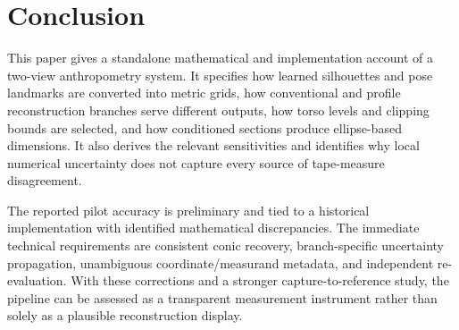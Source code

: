 \documentclass[11pt,a4paper]{article}
\numberwithin{equation}{section}
\begin{document}
\section{Conclusion}
This paper gives a standalone mathematical and implementation account of a two-view anthropometry system. It specifies how learned silhouettes and pose landmarks are converted into metric grids, how conventional and profile reconstruction branches serve different outputs, how torso levels and clipping bounds are selected, and how conditioned sections produce ellipse-based dimensions. It also derives the relevant sensitivities and identifies why local numerical uncertainty does not capture every source of tape-measure disagreement.

The reported pilot accuracy is preliminary and tied to a historical implementation with identified mathematical discrepancies. The immediate technical requirements are consistent conic recovery, branch-specific uncertainty propagation, unambiguous coordinate/measurand metadata, and independent re-evaluation. With these corrections and a stronger capture-to-reference study, the pipeline can be assessed as a transparent measurement instrument rather than solely as a plausible reconstruction display.

\appendix
\end{document}
